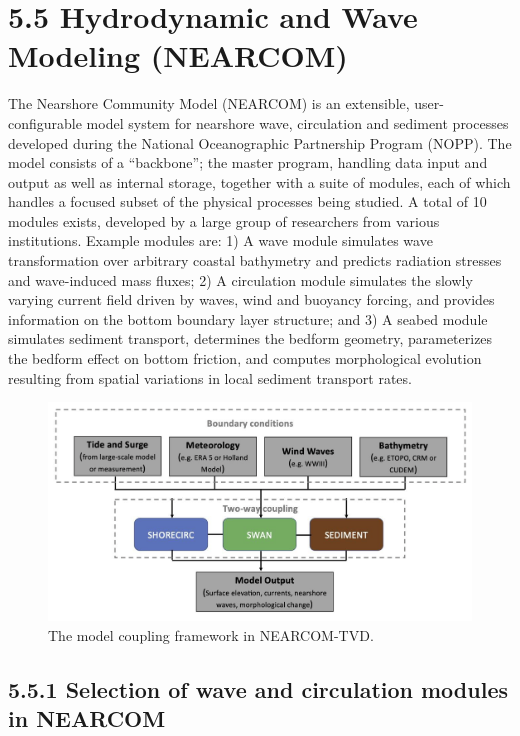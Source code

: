 \documentclass[11pt]{article}
\begin{document}
\section*{5.5 Hydrodynamic and Wave Modeling (NEARCOM)}

The Nearshore Community Model (NEARCOM) is an extensible, user-configurable model system for nearshore wave, circulation and sediment processes developed during the National Oceanographic Partnership Program (NOPP). The model consists of a “backbone”; the master program, handling data input and output as well as internal storage, together with a suite of modules, each of which handles a focused subset of the physical processes being studied. A total of 10 modules exists, developed by a large group of researchers from various institutions. Example modules are: 1) A wave module simulates wave transformation over arbitrary coastal bathymetry and predicts radiation stresses and wave-induced mass fluxes; 2) A circulation module simulates the slowly varying current field driven by waves, wind and buoyancy forcing, and provides information on the bottom boundary layer structure; and 3) A seabed module simulates sediment transport, determines the bedform geometry, parameterizes the bedform effect on bottom friction, and computes morphological evolution resulting from spatial variations in local sediment transport rates.

\begin{figure}[h!]
\centering
\includegraphics[width=\textwidth]{./figures/nearcom_chart.png}
\caption{The model coupling framework in NEARCOM-TVD. }
\label{nearcom_chart}
\centering
\end{figure}

\subsection*{5.5.1 Selection of wave and circulation modules in NEARCOM}
\end{document}
